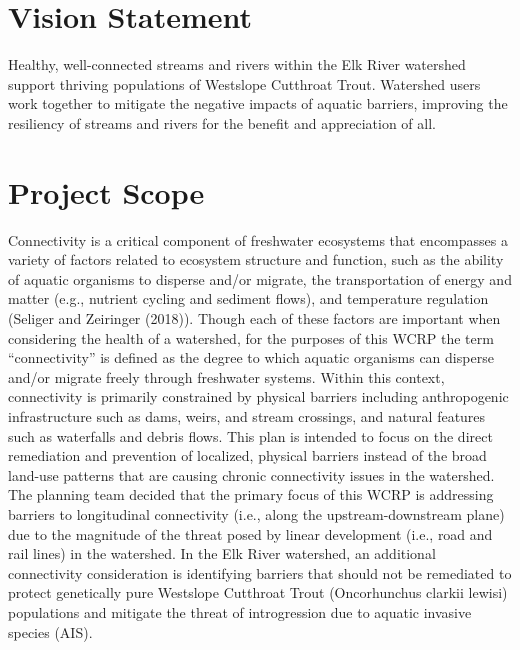 \documentclass[
  letterpaper,
  DIV=11,
  numbers=noendperiod]{scrreprt}
\begin{document}
\section*{Vision Statement}\label{vision-statement}


Healthy, well-connected streams and rivers within the Elk River
watershed support thriving populations of Westslope Cutthroat Trout.
Watershed users work together to mitigate the negative impacts of
aquatic barriers, improving the resiliency of streams and rivers for the
benefit and appreciation of all.

\section*{Project Scope}\label{project-scope}


Connectivity is a critical component of freshwater ecosystems that
encompasses a variety of factors related to ecosystem structure and
function, such as the ability of aquatic organisms to disperse and/or
migrate, the transportation of energy and matter (e.g., nutrient cycling
and sediment flows), and temperature regulation (Seliger and Zeiringer
(2018)). Though each of these factors are important when considering the
health of a watershed, for the purposes of this WCRP the term
``connectivity'' is defined as the degree to which aquatic organisms can
disperse and/or migrate freely through freshwater systems. Within this
context, connectivity is primarily constrained by physical barriers
including anthropogenic infrastructure such as dams, weirs, and stream
crossings, and natural features such as waterfalls and debris flows.
This plan is intended to focus on the direct remediation and prevention
of localized, physical barriers instead of the broad land-use patterns
that are causing chronic connectivity issues in the watershed. The
planning team decided that the primary focus of this WCRP is addressing
barriers to longitudinal connectivity (i.e., along the
upstream-downstream plane) due to the magnitude of the threat posed by
linear development (i.e., road and rail lines) in the watershed. In the
Elk River watershed, an additional connectivity consideration is
identifying barriers that should not be remediated to protect
genetically pure Westslope Cutthroat Trout (Oncorhunchus clarkii lewisi)
populations and mitigate the threat of introgression due to aquatic
invasive species (AIS).
\end{document}
